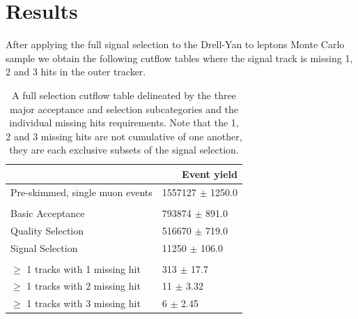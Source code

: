 \documentclass[a4paper,12pt]{article}
\begin{document}
\section{Results}

    After applying the full signal selection to the Drell-Yan to leptons Monte
    Carlo sample we obtain the following cutflow tables where the signal track
    is missing 1, 2 and 3 hits in the outer tracker.

    \begin{table}[!htbp] 
    \begin{center} 
    \begin{tabular}{ll}
                                                                                                                                                                                                         & \multicolumn{1}{r}{Event yield}   \\ 
    \hline 
    Pre-skimmed, single muon events           & 1557127 $\pm$ 1250.0              \\ 
    \\
    Basic Acceptance                          & 793874 $\pm$ 891.0                \\
    Quality Selection                         & 516670 $\pm$ 719.0                \\
    Signal Selection                          & 11250 $\pm$ 106.0                 \\
    \\
    $\geq$ 1 tracks with 1 missing hit        & 313 $\pm$ 17.7                    \\ 
    $\geq$ 1 tracks with 2 missing hit        & 11 $\pm$ 3.32                    \\ 
    $\geq$ 1 tracks with 3 missing hit        & 6 $\pm$ 2.45                    \\ 

    \hline 
    \end{tabular} 
    \end{center} 
    \caption{A full selection cutflow table delineated by the three major
    acceptance and selection subcategories and the individual missing hits
    requirements. Note that the 1, 2 and 3 missing hits are not cumulative of
    one another, they are each exclusive subsets of the signal selection.}
    \end{table} 
\end{document}
